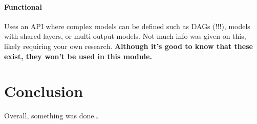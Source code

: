 \documentclass[12pt]{report}
\begin{document}
\subsubsection{Functional}
Uses an API where complex models can be defined such as DAGs (!!!), models with shared layers, 
or multi-output models. Not much info was given on this, likely requiring your own research.
\textbf{Although it's good to know that these exist, they won't be used in this module.}  


\chapter*{Conclusion}

Overall, something was done\dots



\printbibliography
\end{document}
